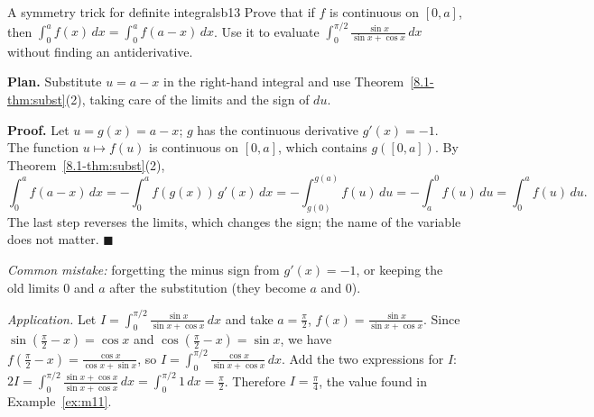 \documentclass[11pt]{article}
\begin{document}
\begin{exmp}{A symmetry trick for definite integrals}{b13}
Prove that if $f$ is continuous on $[0,a]$, then $\int_0^af(x)\,dx=\int_0^af(a-x)\,dx$. Use it to evaluate $\displaystyle\int_0^{\pi/2}\frac{\sin x}{\sin x+\cos x}\,dx$ without finding an antiderivative.

\textbf{Plan.} Substitute $u=a-x$ in the right-hand integral and use Theorem~\ref{8.1-thm:subst}(2), taking care of the limits and the sign of $du$.

\textbf{Proof.} Let $u=g(x)=a-x$; $g$ has the continuous derivative $g'(x)=-1$. The function $u\mapsto f(u)$ is continuous on $[0,a]$, which contains $g([0,a])$. By Theorem~\ref{8.1-thm:subst}(2),
\[\int_0^af(a-x)\,dx=-\int_0^af(g(x))\,g'(x)\,dx=-\int_{g(0)}^{g(a)}f(u)\,du=-\int_a^0f(u)\,du=\int_0^af(u)\,du .\]
The last step reverses the limits, which changes the sign; the name of the variable does not matter. $\blacksquare$

\emph{Common mistake:} forgetting the minus sign from $g'(x)=-1$, or keeping the old limits $0$ and $a$ after the substitution (they become $a$ and $0$).

\emph{Application.} Let $I=\int_0^{\pi/2}\frac{\sin x}{\sin x+\cos x}\,dx$ and take $a=\frac\pi2$, $f(x)=\frac{\sin x}{\sin x+\cos x}$. Since $\sin\left(\frac\pi2-x\right)=\cos x$ and $\cos\left(\frac\pi2-x\right)=\sin x$, we have $f\left(\frac\pi2-x\right)=\frac{\cos x}{\cos x+\sin x}$, so $I=\int_0^{\pi/2}\frac{\cos x}{\sin x+\cos x}\,dx$. Add the two expressions for $I$: $2I=\int_0^{\pi/2}\frac{\sin x+\cos x}{\sin x+\cos x}\,dx=\int_0^{\pi/2}1\,dx=\frac\pi2$. Therefore $I=\frac\pi4$, the value found in Example~\ref{ex:m11}.
\end{exmp}
\end{document}
